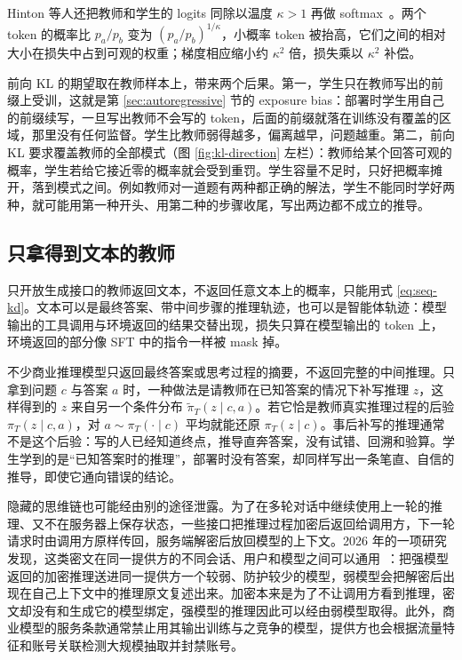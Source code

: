Hinton 等人还把教师和学生的 logits 同除以温度 \(\kappa>1\) 再做 softmax~\cite{hinton2015distilling}。两个 token 的概率比 \(p_a/p_b\) 变为 \((p_a/p_b)^{1/\kappa}\)，小概率 token 被抬高，它们之间的相对大小在损失中占到可观的权重；梯度相应缩小约 \(\kappa^2\) 倍，损失乘以 \(\kappa^2\) 补偿。

前向 KL 的期望取在教师样本上，带来两个后果。第一，学生只在教师写出的前缀上受训，这就是第 \ref{sec:autoregressive} 节的 exposure bias：部署时学生用自己的前缀续写，一旦写出教师不会写的 token，后面的前缀就落在训练没有覆盖的区域，那里没有任何监督。学生比教师弱得越多，偏离越早，问题越重。第二，前向 KL 要求覆盖教师的全部模式（图 \ref{fig:kl-direction} 左栏）：教师给某个回答可观的概率，学生若给它接近零的概率就会受到重罚。学生容量不足时，只好把概率摊开，落到模式之间。例如教师对一道题有两种都正确的解法，学生不能同时学好两种，就可能用第一种开头、用第二种的步骤收尾，写出两边都不成立的推导。

\subsection{只拿得到文本的教师}

只开放生成接口的教师返回文本，不返回任意文本上的概率，只能用式 \eqref{eq:seq-kd}。文本可以是最终答案、带中间步骤的推理轨迹，也可以是智能体轨迹：模型输出的工具调用与环境返回的结果交替出现，损失只算在模型输出的 token 上，环境返回的部分像 SFT 中的指令一样被 mask 掉。

不少商业推理模型只返回最终答案或思考过程的摘要，不返回完整的中间推理。只拿到问题 \(c\) 与答案 \(a\) 时，一种做法是请教师在已知答案的情况下补写推理 \(z\)，这样得到的 \(z\) 来自另一个条件分布 \(\tilde\pi_T(z\mid c,a)\)。若它恰是教师真实推理过程的后验 \(\pi_T(z\mid c,a)\)，对 \(a\sim\pi_T(\cdot\mid c)\) 平均就能还原 \(\pi_T(z\mid c)\)。事后补写的推理通常不是这个后验：写的人已经知道终点，推导直奔答案，没有试错、回溯和验算。学生学到的是“已知答案时的推理”，部署时没有答案，却同样写出一条笔直、自信的推导，即使它通向错误的结论。

隐藏的思维链也可能经由别的途径泄露。为了在多轮对话中继续使用上一轮的推理、又不在服务器上保存状态，一些接口把推理过程加密后返回给调用方，下一轮请求时由调用方原样传回，服务端解密后放回模型的上下文。2026 年的一项研究发现，这类密文在同一提供方的不同会话、用户和模型之间可以通用~\cite{panfilov2026stealing}：把强模型返回的加密推理送进同一提供方一个较弱、防护较少的模型，弱模型会把解密后出现在自己上下文中的推理原文复述出来。加密本来是为了不让调用方看到推理，密文却没有和生成它的模型绑定，强模型的推理因此可以经由弱模型取得。此外，商业模型的服务条款通常禁止用其输出训练与之竞争的模型，提供方也会根据流量特征和账号关联检测大规模抽取并封禁账号。

